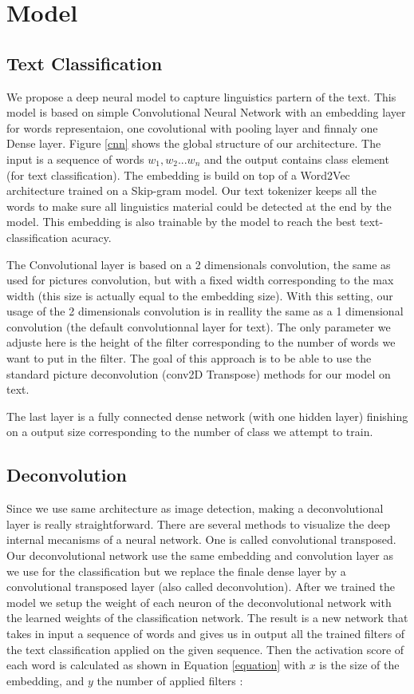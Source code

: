 \section{Model}

\subsection{Text Classification}

We propose a deep neural model to capture linguistics partern of the text. This model is based on simple Convolutional Neural Network with an embedding layer for words representaion, one covolutional with pooling layer and finnaly one Dense layer. Figure \ref{cnn} shows the global structure of our architecture. The input is a sequence of words $ w_{1}, w_{2} ... w_{n} $ and the output contains class element (for text classification). The embedding is build on top of a Word2Vec architecture trained on a Skip-gram model. Our text tokenizer keeps all the words to make sure all linguistics material could be detected at the end by the model. This embedding is also trainable by the model to reach the best text-classification acuracy. 

The Convolutional layer is based on a 2 dimensionals convolution, the same as used for pictures convolution, but with a fixed width corresponding to the max width (this size is actually equal to the embedding size). With this setting, our usage of the 2 dimensionals convolution is in reallity the same as a 1 dimensional convolution (the default convolutionnal layer for text). The only parameter we adjuste here is the height of the filter corresponding to the number of words we want to put in the filter. The goal of this approach is to be able to use the standard picture deconvolution (conv2D Transpose) methods for our model on text.

The last layer is a fully connected dense network (with one hidden layer) finishing on a output size corresponding to the number of class we attempt to train.

\subsection{Deconvolution}

Since we use same architecture as image detection, making a deconvolutional layer is really straightforward. There are several methods to visualize the deep internal mecanisms of a neural network. One is called convolutional transposed. Our deconvolutional network use the same embedding and convolution layer as we use for the classification but we replace the finale dense layer by a convolutional transposed layer (also called deconvolution). After we trained the model we setup the weight of each neuron of the deconvolutional network with the learned weights of the classification network. The result is a new network that takes in input a sequence of words and gives us in output all the trained filters of the text classification applied on the given sequence. Then the activation score of each word is calculated as shown in Equation \ref{equation} with $x$ is the size of the embedding, and $y$ the number of applied filters : 

